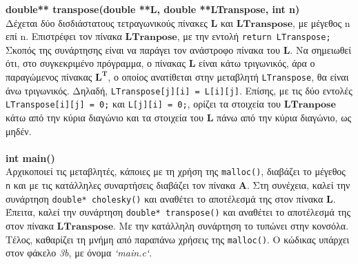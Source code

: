 \documentclass[a4paper, 14pt]{article}   %
\begin{document}
\textbf{double** transpose(double **L, double **LTranspose, int n)}\\
Δέχεται δύο δισδιάστατους τετραγωνικούς πίνακες $\mathbf{L}$ και $\mathbf{LTranspose}$, με μέγεθος n επί n. Επιστρέφει τον πίνακα $\mathbf{LTranpose}$, με την εντολή \texttt{return LTranspose;} Σκοπός της συνάρτησης είναι να παράγει τον ανάστροφο πίνακα του $\mathbf{L}$. Να σημειωθεί ότι, στο συγκεκριμένο πρόγραμμα, ο πίνακας $\mathbf{L}$ είναι κάτω τριγωνικός, άρα ο παραγώμενος πίνακας $\mathbf{L^T}$, ο οποίος ανατίθεται στην μεταβλητή \texttt{LTranspose}, θα είναι άνω τριγωνικός. Δηλαδή, \texttt{LTranspose[j][i] = L[i][j]}. Επίσης, με τις δύο εντολές \texttt{LTranspose[i][j] = 0;} και \texttt{L[j][i] = 0;}, ορίζει τα στοιχεία του $\mathbf{LTranpose}$ κάτω από την κύρια διαγώνιο και τα στοιχεία του $\mathbf{L}$ πάνω από την κύρια διαγώνιο, ως μηδέν.\\\\
\textbf{int main()}\\
Αρχικοποιεί τις μεταβλητές, κάποιες με τη χρήση της \texttt{malloc()}, διαβάζει το μέγεθος \texttt{n} και με τις κατάλληλες συναρτήσεις διαβάζει τον πίνακα $\mathbf{A}$. Στη συνέχεια, καλεί την συνάρτηση \texttt{double* cholesky()} και αναθέτει το αποτέλεσμά της στον πίνακα $\mathbf{L}$. Έπειτα, καλεί την συνάρτηση \texttt{double* transpose()} και αναθέτει το αποτέλεσμά της στον πίνακα $\mathbf{LTranspose}$. Με την κατάλληλη συνάρτηση το τυπώνει στην κονσόλα. Τέλος, καθαρίζει τη μνήμη από παραπάνω χρήσεις της \texttt{malloc()}. Ο κώδικας υπάρχει στον φάκελο \emph{3b}, με όνομα \emph{`main.c`}.\\
\end{document}
